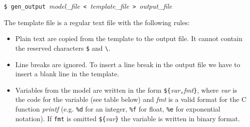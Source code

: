 \medskip
\noindent
\verb|$ gen_output |{\it model\_file}\verb| < |{\it template\_file}\verb| > |{\it output\_file}

\medskip

The template file is a regular text file with the following rules:
\begin{itemize}
\item Plain text are copied from the template to the output file. It cannot contain 
the reserved characters {\tt \$} and {\tt \textbackslash}.
\item Line breaks are ignored. To insert a line break in the output file we have to insert
a blank line in the template.
\item Variables from the model are written in the form 
\mbox{{\tt \$\{}{\it var}{\tt ,}{\it fmt}{\tt \}}}, where {\it var} is the code for the
variable (see table below) and {\it fmt} is a valid format for the C function {\it printf} 
(e.g. {\tt \%d} for an integer, {\tt \%f} for float, {\tt \%e} for exponential notation).
If {\tt fmt} is omitted {\tt\$\{}{\it var}{\tt \}} the variable is written in binary format.
\end{itemize}
\pagebreak

